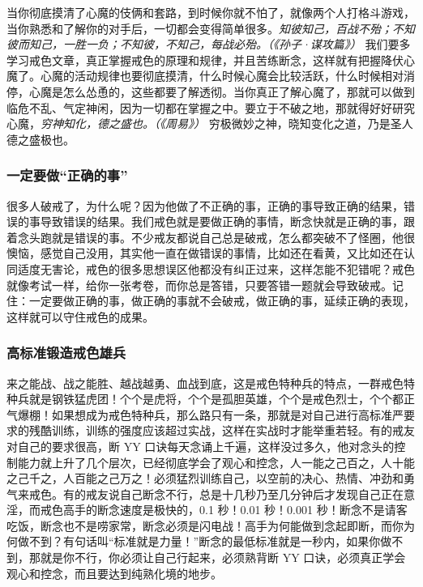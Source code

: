 当你彻底摸清了心魔的伎俩和套路，到时候你就不怕了，就像两个人打格斗游戏，当你熟悉和了解你的对手后，一切都会变得简单很多。\textit{知彼知己，百战不殆；不知彼而知己，一胜一负；不知彼，不知己，每战必殆。（《孙子·谋攻篇》）} 我们要多学习戒色文章，真正掌握戒色的原理和规律，并且苦练断念，这样就有把握降伏心魔了。心魔的活动规律也要彻底摸清，什么时候心魔会比较活跃，什么时候相对消停，心魔是怎么怂恿的，这些都要了解透彻。当你真正了解心魔了，那就可以做到临危不乱、气定神闲，因为一切都在掌握之中。要立于不破之地，那就得好好研究心魔，\textit{穷神知化，德之盛也。（《周易》）} 穷极微妙之神，晓知变化之道，乃是圣人德之盛极也。

\subsubsection{一定要做“正确的事”}

很多人破戒了，为什么呢？因为他做了不正确的事，正确的事导致正确的结果，错误的事导致错误的结果。我们戒色就是要做正确的事情，断念快就是正确的事，跟着念头跑就是错误的事。不少戒友都说自己总是破戒，怎么都突破不了怪圈，他很懊恼，感觉自己没用，其实他一直在做错误的事情，比如还在看黄，又比如还在认同适度无害论，戒色的很多思想误区他都没有纠正过来，这样怎能不犯错呢？戒色就像考试一样，给你一张考卷，而你总是答错，只要答错一题就会导致破戒。记住：一定要做正确的事，做正确的事就不会破戒，做正确的事，延续正确的表现，这样就可以守住戒色的成果。

\subsubsection{高标准锻造戒色雄兵}

来之能战、战之能胜、越战越勇、血战到底，这是戒色特种兵的特点，一群戒色特种兵就是钢铁猛虎团！个个是虎将，个个是孤胆英雄，个个是戒色烈士，个个都正气爆棚！如果想成为戒色特种兵，那么路只有一条，那就是对自己进行高标准严要求的残酷训练，训练的强度应该超过实战，这样在实战时才能举重若轻。有的戒友对自己的要求很高，断 YY 口诀每天念诵上千遍，这样没过多久，他对念头的控制能力就上升了几个层次，已经彻底学会了观心和控念，人一能之己百之，人十能之己千之，人百能之己万之！必须猛烈训练自己，以空前的决心、热情、冲劲和勇气来戒色。有的戒友说自己断念不行，总是十几秒乃至几分钟后才发现自己正在意淫，而戒色高手的断念速度是极快的，0.1 秒！0.01 秒！0.001 秒！断念不是请客吃饭，断念也不是唠家常，断念必须是闪电战！高手为何能做到念起即断，而你为何做不到？有句话叫“标准就是力量！”断念的最低标准就是一秒内，如果你做不到，那就是你不行，你必须让自己行起来，必须熟背断 YY 口诀，必须真正学会观心和控念，而且要达到纯熟化境的地步。

